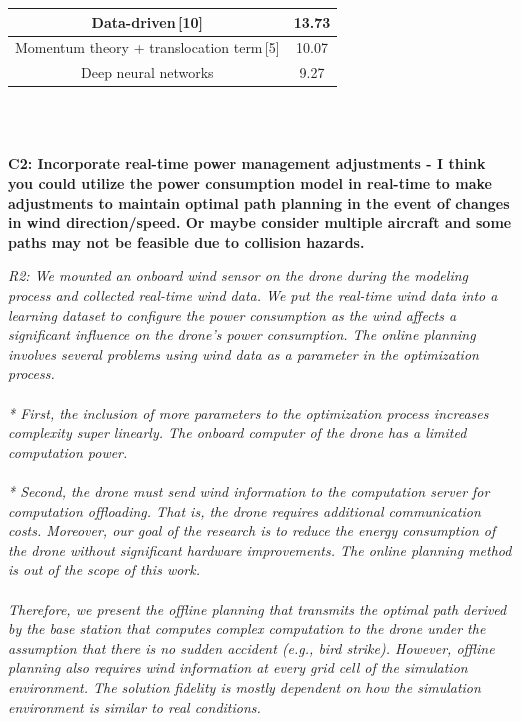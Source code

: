 \documentclass[onecolumn]{IEEEconf}
\begin{document}
\begin{description}
\begin{mdframed}[ linewidth=.75pt, userdefinedwidth=0.9\textwidth]
{\begin{tabular}{|c|c|}
    {Data-driven\,[10]}           & { 13.73}           \\ \hline
    {Momentum theory + translocation term\,[5]}       & { 10.07}           \\ \hline
    {Deep neural networks}  & { 9.27}            \\ \hline
    \end{tabular}%
    }
    \end{mdframed} 
	~\\
	~\\
    \item \textbf
    {
	C2: Incorporate real-time power management adjustments - I think you could utilize the power consumption model in real-time to make adjustments to maintain optimal path planning in the event of changes in wind direction/speed. Or maybe consider multiple aircraft and some paths may not be feasible due to collision hazards.
	}
	\item \textit
	{
	R2: We mounted an onboard wind sensor on the drone during the modeling process and collected real-time wind data. We put the real-time wind data into a learning dataset to configure the power consumption as the wind affects a significant influence on the drone's power consumption. The online planning involves several problems using wind data as a parameter in the optimization process. ~\\~\\
    * First, the inclusion of more parameters to the optimization process increases complexity super linearly. The onboard computer of the drone has a limited computation power.~\\~\\
    * Second, the drone must send wind information to the computation server for computation offloading. That is, the drone requires additional communication costs. Moreover, our goal of the research is to reduce the energy consumption of the drone without significant hardware improvements. The online planning method is out of the scope of this work.~\\~\\
    Therefore, we present the offline planning that transmits the optimal path derived by the base station that computes complex computation to the drone under the assumption that there is no sudden accident (e.g., bird strike). However, offline planning also requires wind information at every grid cell of the simulation environment. The solution fidelity is mostly dependent on how the simulation environment is similar to real conditions. 
}
\end{description}
\end{document}
